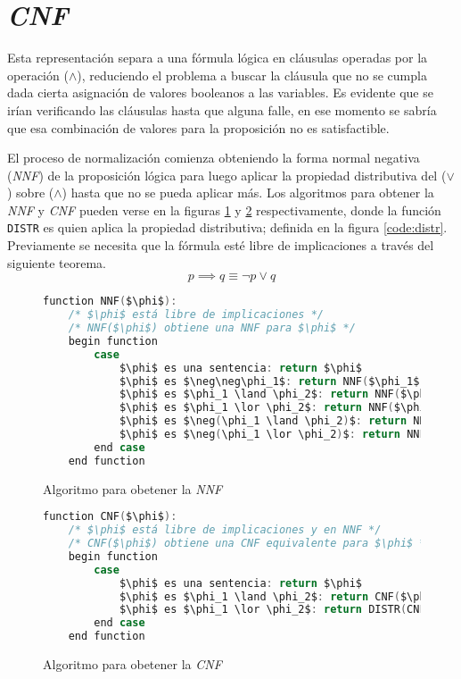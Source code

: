 \section{\textit{CNF}}

Esta representación separa a una fórmula lógica en cláusulas operadas por la operación ($\land$), reduciendo el problema \sat a buscar la cláusula que no se cumpla dada cierta asignación de valores booleanos a las variables. Es evidente que se irían verificando las cláusulas hasta que alguna falle, en ese momento se sabría que esa combinación de valores para la proposición no es satisfactible.

El proceso de normalización comienza obteniendo la forma normal negativa (\textit{NNF}) de la proposición lógica para luego aplicar la propiedad distributiva del ($\lor$) sobre ($\land$) hasta que no se pueda aplicar más. Los algoritmos para obtener la \textit{NNF} y \textit{CNF} pueden verse en la figuras \ref{code:nnf} y \ref{code:cnf} respectivamente\cite{huth2004logic}, donde la función \texttt{DISTR} es quien aplica la propiedad distributiva; definida en la figura \ref{code:distr}. Previamente se necesita que la fórmula esté libre de implicaciones a través del siguiente teorema. \[ p \implies q \equiv \neg p \lor q \]

\begin{figure}
\begin{lstlisting}[language=C,mathescape=true,keywordstyle=\color{black}]
    function NNF($\phi$):
    /* $\phi$ está libre de implicaciones */
    /* NNF($\phi$) obtiene una NNF para $\phi$ */
    begin function
        case
            $\phi$ es una sentencia: return $\phi$
            $\phi$ es $\neg\neg\phi_1$: return NNF($\phi_1$)
            $\phi$ es $\phi_1 \land \phi_2$: return NNF($\phi_1$) $\land$ NNF($\phi_2$)
            $\phi$ es $\phi_1 \lor \phi_2$: return NNF($\phi_1$) $\lor$ NNF($\phi_2$)
            $\phi$ es $\neg(\phi_1 \land \phi_2)$: return NNF($\neg\phi_1$) $\lor$ NNF($\neg\phi_2$)
            $\phi$ es $\neg(\phi_1 \lor \phi_2)$: return NNF($\neg\phi_1$) $\land$ NNF($\neg\phi_2$)
        end case
    end function
\end{lstlisting}
\caption{Algoritmo para obetener la \textit{NNF}}
\label{code:nnf}
\end{figure}

\begin{figure}
\begin{lstlisting}[language=C,mathescape=true,keywordstyle=\color{black}]
    function CNF($\phi$):
    /* $\phi$ está libre de implicaciones y en NNF */
    /* CNF($\phi$) obtiene una CNF equivalente para $\phi$ */
    begin function
        case
            $\phi$ es una sentencia: return $\phi$
            $\phi$ es $\phi_1 \land \phi_2$: return CNF($\phi_1$) $\land$ CNF($\phi_2$)
            $\phi$ es $\phi_1 \lor \phi_2$: return DISTR(CNF($\phi_1$), CNF($\phi_2$))
        end case
    end function
\end{lstlisting}
\caption{Algoritmo para obetener la \textit{CNF}}
\label{code:cnf}
\end{figure}

